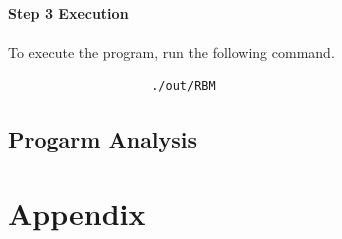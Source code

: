 \documentclass{article}
\begin{document}
            \paragraph{Step 3 Execution}
            \paragraph{}
                To execute the program, run the following command.
                \begin{verbatim}
                    ./out/RBM
                \end{verbatim}

        \subsection{Progarm Analysis}

    \cleardoublepage
    \section{Appendix}
\end{document}
